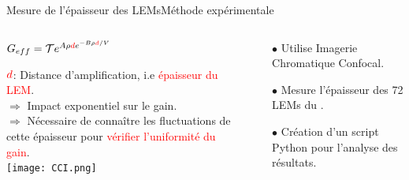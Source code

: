      \begin{frame}{Mesure de l'épaisseur des LEMs}{Méthode expérimentale}
    	\begin{scriptsize}
    		\begin{columns}
    			\begin{column}{0.5\textwidth}
    				\begin{center}
    					$G _{eff}= \mathcal{T}e^{A\rho \textcolor{red}{d} e^{-B\rho \textcolor{red}{d}/V}}$\\
    				\end{center}
    				$\textcolor{red}{d}$: Distance d'amplification, i.e \textcolor{red}{épaisseur du LEM}.\\
    				$\Rightarrow$ Impact exponentiel sur le gain.\\
    				$\Rightarrow$ Nécessaire de connaître les fluctuations de cette épaisseur pour \textcolor{red}{vérifier l'uniformité du gain}.\\
    				\vfill
    				\centering \texttt{[image: CCI.png]}\\\vfill
    			\end{column}
    			\hfill
    			\begin{column}{0.5\textwidth}
    				\begin{itemize}
    					\item[$\bullet$] Utilise Imagerie Chromatique Confocal.
    					\item[$\bullet$] Mesure l'épaisseur des 72 LEMs du \SSS{}.
    					\item[$\bullet$] Création d'un script Python pour l'analyse des résultats.
    				\end{itemize}

\end{column}
\end{columns}
\end{scriptsize}
\end{frame}

